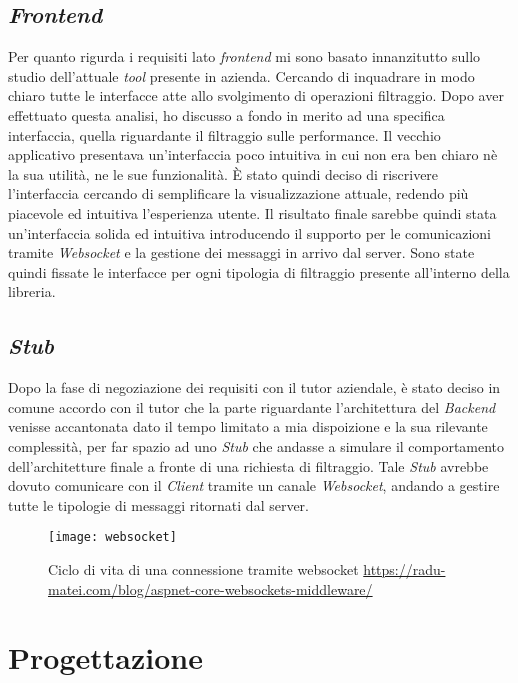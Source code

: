 \subsection{\textit{Frontend}}
Per quanto rigurda i requisiti lato \textit{frontend} mi sono basato innanzitutto sullo studio dell'attuale \textit{tool} presente in azienda. Cercando di inquadrare in modo chiaro tutte le interfacce atte allo svolgimento di operazioni filtraggio. Dopo aver effettuato questa analisi, ho discusso a fondo in merito ad una specifica interfaccia, quella riguardante il filtraggio sulle performance. Il vecchio applicativo presentava un'interfaccia poco intuitiva in cui non era ben chiaro nè la sua utilità, ne le sue funzionalità. È stato quindi deciso di riscrivere l'interfaccia cercando di semplificare la visualizzazione attuale, redendo più piacevole ed intuitiva l'esperienza utente. Il risultato finale sarebbe quindi stata un'interfaccia solida ed intuitiva introducendo il supporto per le comunicazioni tramite \textit{\gls{Websocket}} e la gestione dei messaggi in arrivo dal server. Sono state quindi fissate le interfacce per ogni tipologia di filtraggio presente all'interno della libreria.

\subsection{\textit{Stub}}
Dopo la fase di negoziazione dei requisiti con il tutor aziendale, è stato deciso in comune accordo con il tutor che la parte riguardante l'architettura del \textit{Backend} venisse accantonata dato il tempo limitato a mia dispoizione e la sua rilevante complessità, per far spazio ad uno \textit{Stub} che andasse a simulare il comportamento dell'architetture finale a fronte di una richiesta di filtraggio. Tale \textit{Stub} avrebbe dovuto comunicare con il \textit{Client} tramite un canale \textit{Websocket}, andando a gestire tutte le tipologie di messaggi ritornati dal server.
\begin{figure}[!h] 
	\centering 
	\texttt{[image: websocket]} 
	\caption{Ciclo di vita di una connessione tramite websocket \url{https://radu-matei.com/blog/aspnet-core-websockets-middleware/}}
\end{figure}
\newpage
\section{Progettazione}
